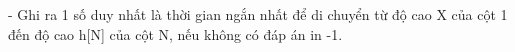 - Ghi ra 1 số duy nhất là thời gian ngắn nhất để di chuyển từ độ cao X của cột 1 đến độ cao h[N] của cột N, nếu không có đáp án in -1.